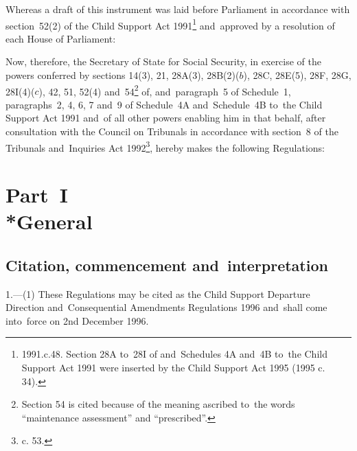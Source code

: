 \documentclass[12pt,a4paper]{article}
\title{\regstitle}
\author{S.I.~1996 No.~2907}
\date{Made 20th November 1996\\Coming into~force 2nd December 1996}
\begin{document}
\maketitle


\medskip

\noindent
Whereas a draft of this instrument was laid before Parliament in accordance with
section~52(2) of the Child Support Act 1991\footnote{\frenchspacing 1991.c.48.
Section 28A to~28I of and~Schedules 4A and~4B to~the Child Support Act 1991 were
inserted by the Child Support Act 1995 (1995 c. 34).} and~approved by a
resolution of each House of Parliament:

Now, therefore, the Secretary of State for Social Security, in exercise of the
powers conferred by sections 14(3), 21, 28A(3), 28B(2)($b$), 28C, 28E(5), 28F,
28G, 28I(4)($c$), 42, 51, 52(4) and~54\footnote{\frenchspacing Section 54 is cited
because of the meaning ascribed to~the words “maintenance assessment” and
“prescribed”.} of, and~paragraph~5 of Schedule~1, paragraphs~2, 4, 6, 7 and~9 of
Schedule~4A and~Schedule~4B to~the Child Support Act 1991 and~of all other
powers enabling him in that behalf, after consultation with the Council on
Tribunals in accordance with section~8 of the Tribunals and~Inquiries Act
1992\footnote{ c. 53.}, hereby makes the following
Regulations:

{\sloppy

\tableofcontents

}

\setcounter{secnumdepth}{-2}

\section[Part~I --- General]{Part~I\\*General}

\subsection[1. Citation, commencement and~interpretation]{Citation, commencement and~interpretation}

\renewcommand\parthead{--- Part~I}

1.—(1) These Regulations
may be cited as the Child Support Departure Direction and~Consequential
Amendments Regulations 1996 and~shall come into~force on 2nd December 1996.
\end{document}
